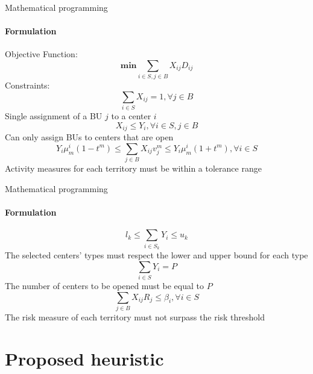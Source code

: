 \documentclass{beamer}
\begin{document}
\begin{frame}{Mathematical programming}
    \framesubtitle{Formulation}
    Objective Function:
    \begin{equation}
        \mathbf{min}\sum_{i \in S, j \in B}{X_{ij} D_{ij}}
    \end{equation}{}
    Constraints:
    \begin{equation}
       \sum_{i \in S} X_{ij} = 1, \forall j \in B
    \end{equation}{}
    \centering \small Single assignment of a BU $j$ to a center $i$
    \begin{equation}
        X_{ij} \le Y_i, \forall i \in S, j \in B
    \end{equation}{}
    Can only assign BUs to centers that are open
    \begin{equation}
        Y_i\mu_m^i(1-t^m) \le \sum_{j\in B}X_{ij}v_j^m \le Y_i\mu_m^i(1+t^m), \forall i \in S
    \end{equation}{}
    Activity measures for each territory must be within a tolerance range
\end{frame}

\begin{frame}{Mathematical programming}
    \framesubtitle{Formulation}
    \begin{equation}
        l_k \le \sum_{i \in S_k} Y_i \le u_k
    \end{equation}{}
    The selected centers' types must respect the lower and upper bound for each type
    \begin{equation}
        \sum_{i \in S} Y_i = P
    \end{equation}{}
    The number of centers to be opened must be equal to $P$
    \begin{equation}
        \sum_{j \in B}X_{ij}R_j \le \beta_i, \forall i \in S
    \end{equation}{}
    The risk measure of each territory must not surpass the risk threshold
\end{frame}

\section{Proposed heuristic}
\end{document}
